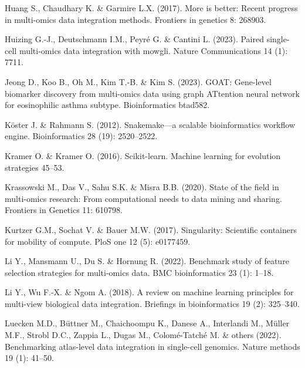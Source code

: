 \documentclass[
]{article}
\newlength{\cslhangindent}
\newlength{\cslentryspacingunit} %
\newenvironment{CSLReferences}[2] %
 {%
  \setlength{\parindent}{0pt}
  \ifodd #1
  \let\oldpar\par
  \def\par{\hangindent=\cslhangindent\oldpar}
  \fi
  \setlength{\parskip}{#2\cslentryspacingunit}
 }%
 {}
\begin{document}
\begin{CSLReferences}{1}{0}
\leavevmode{}%
Huang S., Chaudhary K. \& Garmire L.X. (2017). More is better: Recent progress in multi-omics data integration methods. Frontiers in genetics 8: 268903.

\leavevmode{}%
Huizing G.-J., Deutschmann I.M., Peyré G. \& Cantini L. (2023). Paired single-cell multi-omics data integration with mowgli. Nature Communications 14 (1): 7711.

\leavevmode{}%
Jeong D., Koo B., Oh M., Kim T.-B. \& Kim S. (2023). GOAT: Gene-level biomarker discovery from multi-omics data using graph ATtention neural network for eosinophilic asthma subtype. Bioinformatics btad582.

\leavevmode{}%
Köster J. \& Rahmann S. (2012). Snakemake---a scalable bioinformatics workflow engine. Bioinformatics 28 (19): 2520--2522.

\leavevmode{}%
Kramer O. \& Kramer O. (2016). Scikit-learn. Machine learning for evolution strategies 45--53.

\leavevmode{}%
Krassowski M., Das V., Sahu S.K. \& Misra B.B. (2020). State of the field in multi-omics research: From computational needs to data mining and sharing. Frontiers in Genetics 11: 610798.

\leavevmode{}%
Kurtzer G.M., Sochat V. \& Bauer M.W. (2017). Singularity: Scientific containers for mobility of compute. PloS one 12 (5): e0177459.

\leavevmode{}%
Li Y., Mansmann U., Du S. \& Hornung R. (2022). Benchmark study of feature selection strategies for multi-omics data. BMC bioinformatics 23 (1): 1--18.

\leavevmode{}%
Li Y., Wu F.-X. \& Ngom A. (2018). A review on machine learning principles for multi-view biological data integration. Briefings in bioinformatics 19 (2): 325--340.

\leavevmode{}%
Luecken M.D., Büttner M., Chaichoompu K., Danese A., Interlandi M., Müller M.F., Strobl D.C., Zappia L., Dugas M., Colomé-Tatché M. \& others (2022). Benchmarking atlas-level data integration in single-cell genomics. Nature methods 19 (1): 41--50.


\end{CSLReferences}
\end{document}
